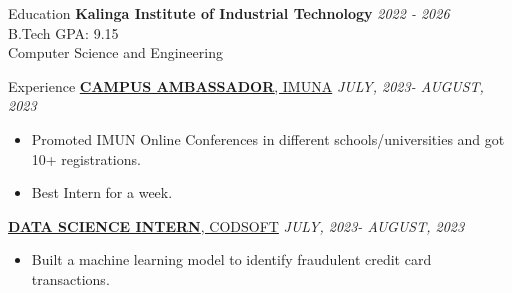 \documentclass{resume} %
\begin{document}

\begin{rSection}{Education}
{\bf Kalinga Institute of Industrial Technology} \hfill {\em 2022 - 2026} 
\\ B.Tech\hfill { GPA: 9.15 }
\\ Computer Science and Engineering
\\

\end{rSection}
\begin{rSection}{Experience}
\href{https://1drv.ms/i/s!AqmF3ryI8xyngdlvi5puoHlWRF5NTQ?e=hyfCRH}{{\bf CAMPUS AMBASSADOR}{, IMUNA}} \hfill {\em JULY, 2023- AUGUST, 2023}
\begin{itemize}
    \item Promoted IMUN Online Conferences in different schools/universities and got 10+ registrations.
    \item Best Intern for a week.
\end{itemize}
\href{https://1drv.ms/i/s!AqmF3ryI8xyngdlGXj5IJlWhZwavZg?e=YFaQiy}{{\bf  DATA SCIENCE INTERN}{, CODSOFT}} \hfill {\em JULY, 2023- AUGUST, 2023}
\begin{itemize}
    \item Built a machine learning model to identify fraudulent credit card transactions.
\end{itemize}

\end{rSection}
\end{document}
